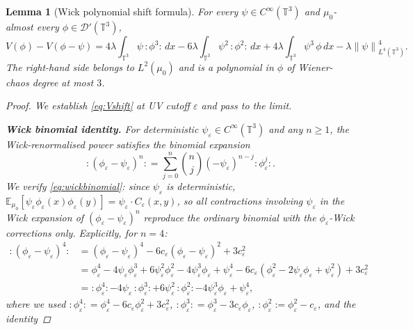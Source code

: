 \documentclass[11pt,a4paper]{article}
\newtheorem{lemma}[theorem]{Lemma}
\theoremstyle{definition}
\newcommand{\T}{\mathbb{T}}
\newcommand{\E}{\mathbb{E}}
\newcommand{\Dc}{\mathcal{D}}
\newcommand{\norm}[1]{\left\|#1\right\|}
\newcommand{\wick}[1]{:\!#1\!:}
\begin{document}
\begin{lemma}[Wick polynomial shift formula]\label{lem:wickshift}
For every $\psi\in C^\infty(\T^3)$ and $\mu_0$-almost every $\phi\in\Dc'(\T^3)$,
\begin{equation}\label{eq:Vshift}
V(\phi) - V(\phi-\psi)
= 4\lambda\!\int_{\T^3}\!\psi\,\wick{\phi^3}\,dx
  -6\lambda\!\int_{\T^3}\!\psi^2\,\wick{\phi^2}\,dx
  +4\lambda\!\int_{\T^3}\!\psi^3\,\phi\,dx
  -\lambda\norm{\psi}_{L^4(\T^3)}^4.
\end{equation}
The right-hand side belongs to $L^2(\mu_0)$ and is a polynomial in $\phi$ of Wiener-chaos degree at most $3$.

\begin{proof}
We establish \eqref{eq:Vshift} at UV cutoff $\varepsilon$ and pass to the limit.

\medskip
\noindent\textbf{Wick binomial identity.}
For deterministic $\psi_\varepsilon\in C^\infty(\T^3)$ and any $n\ge 1$, the Wick-renormalised power satisfies the binomial expansion
\begin{equation}\label{eq:wickbinomial}
\wick{(\phi_\varepsilon-\psi_\varepsilon)^n} = \sum_{j=0}^{n}\binom{n}{j}(-\psi_\varepsilon)^{n-j}\wick{\phi_\varepsilon^j}.
\end{equation}
We verify \eqref{eq:wickbinomial}: since $\psi_\varepsilon$ is deterministic, $\E_{\mu_0}[\psi_\varepsilon\phi_\varepsilon(x)\phi_\varepsilon(y)] = \psi_\varepsilon\cdot C_\varepsilon(x,y)$, so all contractions involving $\psi_\varepsilon$ in the Wick expansion of $(\phi_\varepsilon-\psi_\varepsilon)^n$ reproduce the ordinary binomial with the $\phi_\varepsilon$-Wick corrections only.
Explicitly, for $n=4$:
\begin{align}
\wick{(\phi_\varepsilon-\psi_\varepsilon)^4}
&= (\phi_\varepsilon-\psi_\varepsilon)^4 - 6c_\varepsilon(\phi_\varepsilon-\psi_\varepsilon)^2 + 3c_\varepsilon^2\nonumber\\
&= \phi_\varepsilon^4 - 4\psi_\varepsilon\phi_\varepsilon^3 + 6\psi_\varepsilon^2\phi_\varepsilon^2 - 4\psi_\varepsilon^3\phi_\varepsilon + \psi_\varepsilon^4
   -6c_\varepsilon(\phi_\varepsilon^2 - 2\psi_\varepsilon\phi_\varepsilon + \psi_\varepsilon^2) + 3c_\varepsilon^2\nonumber\\
&= \wick{\phi_\varepsilon^4} - 4\psi_\varepsilon\,\wick{\phi_\varepsilon^3} + 6\psi_\varepsilon^2\,\wick{\phi_\varepsilon^2} - 4\psi_\varepsilon^3\phi_\varepsilon + \psi_\varepsilon^4,\label{eq:wick4expand}
\end{align}
where we used $\wick{\phi_\varepsilon^4} = \phi_\varepsilon^4 - 6c_\varepsilon\phi_\varepsilon^2+3c_\varepsilon^2$, $\wick{\phi_\varepsilon^3} = \phi_\varepsilon^3-3c_\varepsilon\phi_\varepsilon$, $\wick{\phi_\varepsilon^2}=\phi_\varepsilon^2-c_\varepsilon$, and the identity

\end{proof}
\end{lemma}
\end{document}
